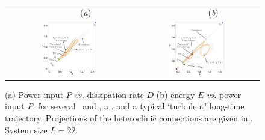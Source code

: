 \begin{figure}[t]
\begin{center}
 \begin{tabular}{cc}
        ~~~~~~~~(\textit{a})                        &   ~~~~~~~~(\textit{b}) \\
    \includegraphics[width=0.46\textwidth, clip=true]{figs/energyBalance_pst.eps}  & \includegraphics[width=0.46\textwidth, clip=true]{figs/equivaEP_pst.eps}

  \end{tabular}
\end{center}
\caption{
(a) Power input $P$ {\em vs.}
dissipation rate $D$
(b) energy $E$  {\em vs.}
power input $P$,   for several  \eqva\ and \reqva,
a \rpo, and a typical `turbulent' long-time trajectory.
Projections of the heteroclinic connections are
given in .
System size $L=22$.
        }
\label{f:drivedrag}
\end{figure}

